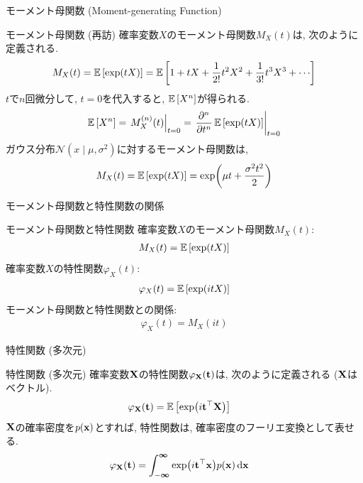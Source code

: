 \documentclass[dvipdfmx,notheorems,t]{beamer}
\begin{document}
\begin{frame}{モーメント母関数 (Moment-generating Function)}
\begin{block}{モーメント母関数 (再訪)}
  確率変数$X$のモーメント母関数$M_X(t)$は, 次のように定義される.
  \begin{align*}
    M_X(t) = \E{\exp(tX)} = \E{1 + tX + \frac{1}{2!} t^2 X^2 + \frac{1}{3!} t^3 X^3 + \cdots}
  \end{align*}
  $t$で$n$回微分して, $t = 0$を代入すると, $\operatorname{\mathbb{E}} \left[ X^n \right]$が得られる.
  \begin{align*}
    \operatorname{\mathbb{E}} \left[ X^n \right] = \left. M_X^{(n)}(t) \right|_{t = 0} = \left. \pdv[n]{t} \operatorname{\mathbb{E}} \left[ \exp(tX) \right] \right|_{t = 0}
  \end{align*}
  ガウス分布$\mathcal{N}(x \mid \mu, \sigma^2)$に対するモーメント母関数は,
  \begin{align*}
    M_X(t) = \operatorname{\mathbb{E}} \left[ \exp(tX) \right] = \exp(\mu t + \frac{\sigma^2 t^2}{2})
  \end{align*}
\end{block}
\end{frame}

\begin{frame}{モーメント母関数と特性関数の関係}
\begin{block}{モーメント母関数と特性関数}
  確率変数$X$のモーメント母関数$M_X(t)$:
  \begin{align*}
    M_X(t) = \operatorname{\mathbb{E}} \left[ \exp(tX) \right]
  \end{align*}
  確率変数$X$の特性関数$\varphi_X(t)$:
  \begin{align*}
    \varphi_X(t) = \operatorname{\mathbb{E}} \left[ \exp(itX) \right]
  \end{align*}
  モーメント母関数と特性関数との関係:
  \begin{align*}
    \varphi_X(t) = M_X(it)
  \end{align*}
\end{block}
\end{frame}

\begin{frame}{特性関数 (多次元)}
\begin{block}{特性関数 (多次元)}
  確率変数$\vb{X}$の特性関数$\varphi_{\vb{X}}(\vb{t})$は, 次のように定義される ($\vb{X}$はベクトル).
  \begin{align*}
    \varphi_{\vb{X}}(\vb{t}) &= \operatorname{\mathbb{E}} \left[ \exp(i \vb{t}^\top \vb{X}) \right]
  \end{align*}
  $\vb{X}$の確率密度を$p(\vb{x})$とすれば, 特性関数は, 確率密度のフーリエ変換として表せる.
  \begin{align*}
    \varphi_{\vb{X}}(\vb{t}) &= \int_{-\boldsymbol{\infty}}^{\boldsymbol{\infty}}
      \exp(i \vb{t}^\top \vb{x}) p(\vb{x}) \dd{\vb{x}}
  \end{align*}
\end{block}
\end{frame}
\end{document}
